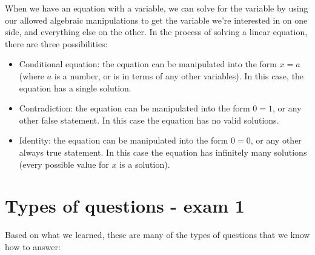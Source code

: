 \documentclass{article}
\begin{document}
When we have an equation with a variable, we can solve for the variable by using our allowed algebraic manipulations to get the variable we're interested in on one side, and everything else on the other. In the process of solving a linear equation, there are three possibilities:
\begin{itemize}
    \item Conditional equation: the equation can be manipulated into the form $x=a$ (where $a$ is a number, or is in terms of any other variables). In this case, the equation has a single solution.
    \item Contradiction: the equation can be manipulated into the form $0=1$, or any other false statement. In this case the equation has no valid solutions.
    \item Identity: the equation can be manipulated into the form $0=0$, or any other always true statement. In this case the equation has infinitely many solutions (every possible value for $x$ is a solution).
\end{itemize}

\newpage
\section*{Types of questions - exam 1}

Based on what we learned, these are many of the types of questions that we know how to answer:
\end{document}
